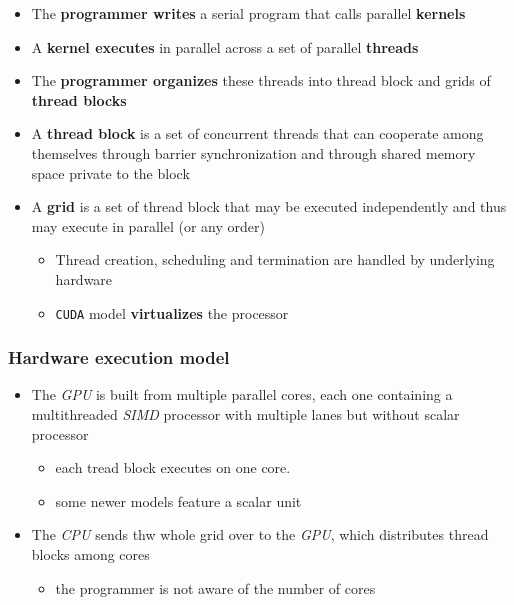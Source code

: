 \documentclass[english]{article}
\begin{document}
\begin{itemize}
  \item The \textbf{programmer writes} a serial program that calls parallel \textbf{kernels}
  \item A \textbf{kernel executes} in parallel across a set of parallel \textbf{threads}
  \item The \textbf{programmer organizes} these threads into thread block and grids of \textbf{thread blocks}
  \item A \textbf{thread block} is a set of concurrent threads that can cooperate among themselves through barrier synchronization and through shared memory space private to the block
  \item A \textbf{grid} is a set of thread block that may be executed independently and thus may execute in parallel (or any order)
        \begin{itemize}
          \item Thread creation, scheduling and termination are handled by underlying hardware
          \item \texttt{CUDA} model \textbf{virtualizes} the processor
        \end{itemize}
\end{itemize}

\subsubsection{Hardware execution model}

\begin{itemize}
  \item The \textit{GPU} is built from multiple parallel cores, each one containing a multithreaded \textit{SIMD} processor with multiple lanes but without scalar processor
        \begin{itemize}
          \item each tread block executes on one core.
          \item some newer models feature a scalar unit
        \end{itemize}
  \item The \textit{CPU} sends thw whole grid over to the \textit{GPU}, which distributes thread blocks among cores
        \begin{itemize}
          \item the programmer is not aware of the number of cores
        \end{itemize}
\end{itemize}
\end{document}

